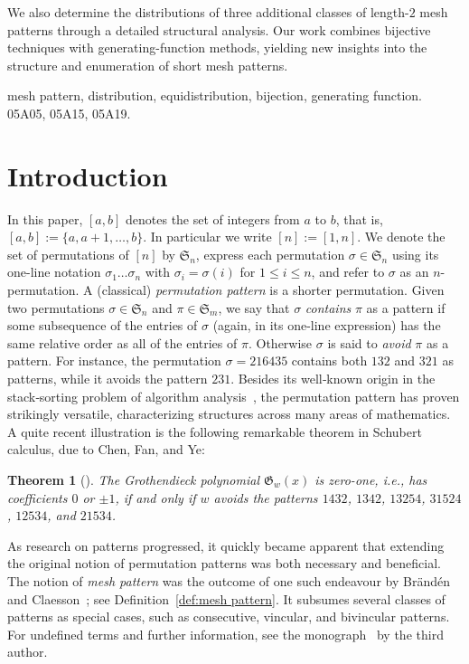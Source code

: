 \documentclass[12pt]{article}
\newtheorem{thm}{Theorem}[section]
\def\fS{\mathfrak{S}}
\def\fG{\mathfrak{G}}
\begin{document}
We also determine the distributions of three additional classes of length-$2$ mesh patterns through a detailed structural analysis. Our work combines bijective techniques with generating-function methods, yielding new insights into the structure and enumeration of short mesh patterns.


  mesh pattern, distribution, equidistribution, bijection, generating function. \\[-5mm]

  05A05, 05A15, 05A19.

\section{Introduction}\label{intro}

In this paper, $[a,b]$ denotes the set of integers from $a$ to $b$, that is, $[a,b] := \{a, a+1, \ldots, b\}$. In particular we write $[n]:=[1,n]$. We denote the set of permutations of $[n]$ by $\fS_n$, express each permutation $\sigma\in\fS_n$ using its one-line notation $\sigma_1\ldots\sigma_n$ with $\sigma_i=\sigma(i)$ for $1\le i\le n$, and refer to $\sigma$ as an $n$-permutation. A (classical) \emph{permutation pattern} is a shorter permutation. Given two permutations $\sigma\in\fS_n$ and $\pi\in\fS_m$, we say that $\sigma$ \emph{contains} $\pi$ as a pattern if some subsequence of the entries of $\sigma$ (again, in its one-line expression) has the same relative order as all of the entries of $\pi$. Otherwise $\sigma$ is said to \emph{avoid} $\pi$ as a pattern. For instance, the permutation $\sigma=216435$ contains both $132$ and $321$ as patterns, while it avoids the pattern $231$. Besides its well‑known origin in the stack‑sorting problem of algorithm analysis~\cite{Knu1997}, the permutation pattern has proven strikingly versatile, characterizing structures across many areas of mathematics. A quite recent illustration is the following remarkable theorem in Schubert calculus, due to Chen, Fan, and Ye:
\begin{thm}[{\cite[Theorem~1.1]{CFY2026}}]
The Grothendieck polynomial $\fG_w(x)$ is zero-one, i.e., has coefficients $0$ or $\pm 1$, if and only if $w$ avoids the patterns $1432$, $1342$, $13254$, $31524$, $12534$, and $21534$.
\end{thm}

As research on patterns progressed, it quickly became apparent that extending the original notion of permutation patterns was both necessary and beneficial. The notion of {\it mesh pattern} was the outcome of one such endeavour by Br\"and\'en and Claesson~\cite{BC2011}; see Definition~\ref{def:mesh pattern}. It subsumes several classes of patterns as special cases, such as consecutive, vincular, and bivincular patterns. For undefined terms and further information, see the monograph~\cite{Kit2011} by the third author.
\end{document}
